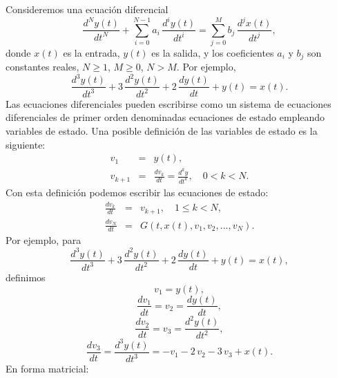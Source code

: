 Consideremos una ecuación diferencial
\begin{equation}
	\frac{d^{N} y(t)}{dt^{N}} + \sum_{i=0}^{N-1} a_{i} \, \frac{d^{i} y(t)}{dt^{i}} = \sum_{j=0}^{M} b_{j} \, \frac{d^{j} x(t)}{dt^{j}},
\end{equation}
donde $x(t)$ es la entrada, $y(t)$ es la salida, y los coeficientes $a_{i}$ y $b_{j}$ son constantes reales, $N \geq 1$, $M \geq 0$, $N > M$. Por ejemplo,
\begin{equation}
	\frac{d^{3}y(t)}{dt^{3}} + 3 \, \frac{d^{2}y(t)}{dt^{2}} + 2 \, \frac{dy(t)}{dt} + y(t) = x(t).
\end{equation}
Las ecuaciones diferenciales pueden escribirse como un sistema de ecuaciones diferenciales de primer orden denominadas ecuaciones de estado empleando variables de estado. Una posible definición de las variables de estado es la siguiente:
\begin{eqnarray}
	v_{1}   &=& y(t),                                               \\
	v_{k+1} &=& \frac{dv_{k}}{dt} = \frac{d^{k}y}{dt^{k}}, \quad 0 < k < N .
\end{eqnarray}
Con esta definición podemos escribir las ecuaciones de estado:
\begin{eqnarray}
	\frac{dv_{k}}{dt} &=& v_{k+1}, \quad 1 \leq k < N,  \\
	\frac{dv_{N}}{dt} &=& G(t, x(t), v_{1}, v_{2},...,v_{N}).
\end{eqnarray}
Por ejemplo, para
\begin{equation}
	\frac{d^{3}y(t)}{dt^{3}} + 3 \, \frac{d^{2}y(t)}{dt^{2}} + 2 \, \frac{dy(t)}{dt} + y(t) = x(t),
\end{equation}
definimos
\begin{equation}
	v_{1} = y(t),
\end{equation}
\begin{equation}
	\frac{dv_{1}}{dt} = v_{2} = \frac{dy(t)}{dt},
\end{equation}
\begin{equation}
	\frac{dv_{2}}{dt} = v_{3} = \frac{d^{2}y(t)}{dt^{2}},
\end{equation}
\begin{equation}
	\frac{dv_{3}}{dt} = \frac{d^{3}y(t)}{dt^{3}} = -v_{1} - 2 \, v_{2} - 3 \, v_{3} + x(t).
\end{equation}
En forma matricial:
